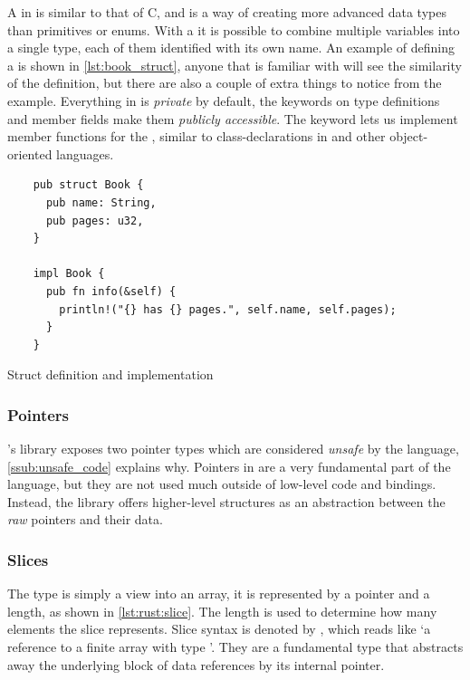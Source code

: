 A  in {\rust} is similar to that of C, and is a way of creating more advanced data types than primitives or enums.
With a  it is possible to combine multiple variables into a single type, each of them identified with its own name.
An example of defining a  is shown in \autoref{lst:book_struct}, anyone that is familiar with {\C} will see the similarity of the  definition, but there are also a couple of extra things to notice from the example.
Everything in {\rust} is \emph{private} by default, the  keywords on type definitions and member fields make them \emph{publicly accessible}.
The  keyword lets us implement member functions for the , similar to class-declarations in {\Cpp} and other object-oriented languages.

\begin{listing}[H]
  \begin{verbatim}
    pub struct Book {
      pub name: String,
      pub pages: u32,
    }

    impl Book {
      pub fn info(&self) {
        println!("{} has {} pages.", self.name, self.pages);
      }
    }
  \end{verbatim}
  \caption{Struct definition and implementation}
  \label{lst:book_struct}
\end{listing}

\subsubsection{Pointers}

\rust's {\core} library exposes two pointer types which are considered \emph{unsafe} by the language, \autoref{ssub:unsafe_code} explains why.
Pointers in {\rust} are a very fundamental part of the language, but they are not used much outside of low-level code and bindings.
Instead, the library offers higher-level structures as an abstraction between the \emph{raw} pointers and their data.

\subsubsection{Slices}

The  type is simply a view into an array, it is represented by a pointer and a length, as shown in \autoref{lst:rust:slice}.
The length is used to determine how many elements the slice represents.
Slice syntax is denoted by \code{\&[T]}, which reads like `a reference to a finite array with type '.
They are a fundamental type that abstracts away the underlying block of data references by its internal pointer.

